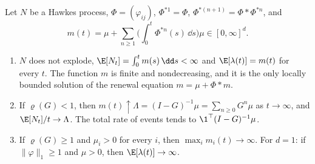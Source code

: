\begin{proposition}\label{prop:hk-stationary}
Let $N$ be a Hawkes process, $\Phi=(\varphi_{ij})$, $\Phi^{*1}=\Phi$, $\Phi^{*(n+1)}=\Phi*\Phi^{*n}$, and
\[
  m(t)=\mu+\sum_{n\ge1}\Big(\int_0^t\Phi^{*n}(s)\,\dd s\Big)\mu\in[0,\infty]^d .
\]
\begin{enumerate}[label=(\roman*)]
  \item $N$ does not explode, $\E[N_t]=\int_0^tm(s)\,\dd s<\infty$ and $\E[\lambda(t)]=m(t)$ for every $t$. The
    function $m$ is finite and nondecreasing, and it is the only locally bounded solution of the renewal
    equation $m=\mu+\Phi*m$.
  \item If $\varrho(G)<1$, then $m(t)\uparrow\Lambda=(I-G)^{-1}\mu=\sum_{n\ge0}G^n\mu$ as $t\to\infty$, and
    $\E[N_t]/t\to\Lambda$. The total rate of events tends to $\1^\top(I-G)^{-1}\mu$.
  \item If $\varrho(G)\ge1$ and $\mu_i>0$ for every $i$, then $\max_im_i(t)\to\infty$. For $d=1$: if
    $\|\varphi\|_1\ge1$ and $\mu>0$, then $\E[\lambda(t)]\to\infty$.
\end{enumerate}
\end{proposition}


